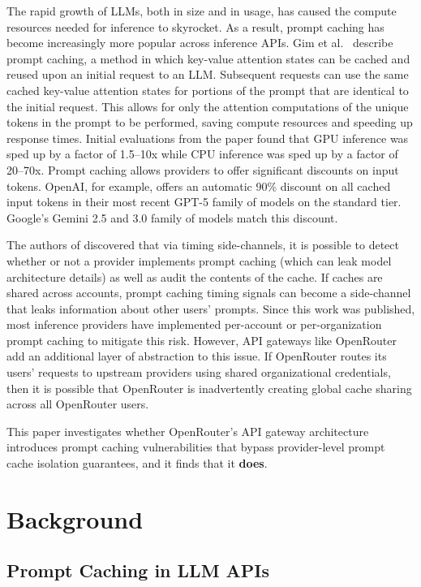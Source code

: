 \documentclass[conference]{IEEEtran}
\begin{document}
The rapid growth of LLMs, both in size and in usage, has caused the compute resources needed for inference to skyrocket.
As a result, prompt caching has become increasingly more popular across inference APIs.
Gim et al.~\cite{gim2024promptcache} describe prompt caching, a method in which key-value attention states can be cached and reused upon an initial request to an LLM.
Subsequent requests can use the same cached key-value attention states for portions of the prompt that are identical to the initial request.
This allows for only the attention computations of the unique tokens in the prompt to be performed, saving compute resources and speeding up response times.
Initial evaluations from the paper found that GPU inference was sped up by a factor of 1.5--10x while CPU inference was sped up by a factor of 20--70x.
Prompt caching allows providers to offer significant discounts on input tokens.
OpenAI, for example, offers an automatic 90\% discount on all cached input tokens in their most recent GPT-5 family of models on the standard tier.
Google's Gemini 2.5 and 3.0 family of models match this discount.

The authors of \cite{DBLP:conf/icml/GuLKLH25} discovered that via timing side-channels, it is possible to detect whether or not a provider implements prompt caching (which can leak model architecture details) as well as audit the contents of the cache.
If caches are shared across accounts, prompt caching timing signals can become a side-channel that leaks information about other users' prompts.
Since this work was published, most inference providers have implemented per-account or per-organization prompt caching to mitigate this risk.
However, API gateways like OpenRouter add an additional layer of abstraction to this issue.
If OpenRouter routes its users' requests to upstream providers using shared organizational credentials, then it is possible that OpenRouter is inadvertently creating global cache sharing across all OpenRouter users.

This paper investigates whether OpenRouter's API gateway architecture introduces prompt caching vulnerabilities that bypass provider-level prompt cache isolation guarantees, and it finds that it \textbf{does}.

\section{Background}
\label{sec:background}

\subsection{Prompt Caching in LLM APIs}
\end{document}
